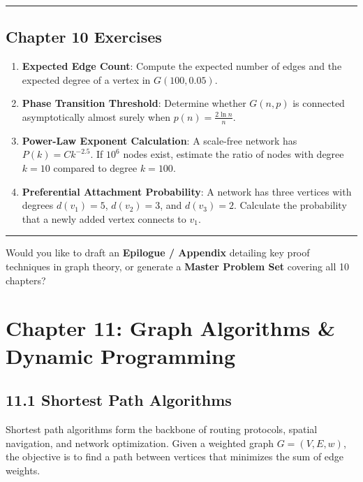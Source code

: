 \documentclass[
]{book}
\providecommand{\tightlist}{%
  \setlength{\itemsep}{0pt}\setlength{\parskip}{0pt}}
\theoremstyle{definition}
\theoremstyle{definition}
\theoremstyle{definition}
\theoremstyle{definition}
\theoremstyle{remark}
\begin{document}
\begin{center}\rule{0.5\linewidth}{0.5pt}\end{center}

\section{Chapter 10 Exercises}\label{chapter-10-exercises}

\begin{enumerate}
\def\labelenumi{\arabic{enumi}.}
\tightlist
\item
  \textbf{Expected Edge Count}: Compute the expected number of edges and the expected degree of a vertex in \(G(100, 0.05)\).
\item
  \textbf{Phase Transition Threshold}: Determine whether \(G(n, p)\) is connected asymptotically almost surely when \(p(n) = \frac{2 \ln n}{n}\).
\item
  \textbf{Power-Law Exponent Calculation}: A scale-free network has \(P(k) = C k^{-2.5}\). If \(10^6\) nodes exist, estimate the ratio of nodes with degree \(k=10\) compared to degree \(k=100\).
\item
  \textbf{Preferential Attachment Probability}: A network has three vertices with degrees \(d(v_1)=5\), \(d(v_2)=3\), and \(d(v_3)=2\). Calculate the probability that a newly added vertex connects to \(v_1\).
\end{enumerate}

\begin{center}\rule{0.5\linewidth}{0.5pt}\end{center}

Would you like to draft an \textbf{Epilogue / Appendix} detailing key proof techniques in graph theory, or generate a \textbf{Master Problem Set} covering all 10 chapters?

\chapter{Chapter 11: Graph Algorithms \& Dynamic Programming}\label{chapter-11-graph-algorithms-dynamic-programming}

\section{11.1 Shortest Path Algorithms}\label{shortest-path-algorithms}

Shortest path algorithms form the backbone of routing protocols, spatial navigation, and network optimization. Given a weighted graph \(G = (V, E, w)\), the objective is to find a path between vertices that minimizes the sum of edge weights.
\end{document}
